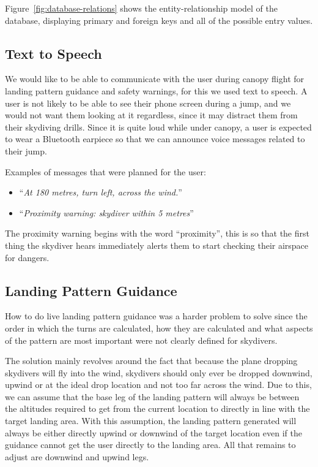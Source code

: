Figure~\ref{fig:database-relations} shows the entity-relationship model of the database, displaying primary and foreign keys and all of the possible entry values.

\subsection{Text to Speech}
We would like to be able to communicate with the user during canopy flight for landing pattern guidance and safety warnings, for this we used text to speech. A user is not likely to be able to see their phone screen during a jump, and we would not want them looking at it regardless, since it may distract them from their skydiving drills. Since it is quite loud while under canopy, a user is expected to wear a Bluetooth earpiece so that we can announce voice messages related to their jump.

Examples of messages that were planned for the user:
\begin{itemize}
  \item ``\textit{At 180 metres, turn left, across the wind.}''
  \item ``\textit{Proximity warning: skydiver within 5 metres}''
\end{itemize}

The proximity warning begins with the word ``proximity'', this is so that the first thing the skydiver hears immediately alerts them to start checking their airspace for dangers.

\subsection{Landing Pattern Guidance}\label{subsec:landing-guidance}
How to do live landing pattern guidance was a harder problem to solve since the order in which the turns are calculated, how they are calculated and what aspects of the pattern are most important were not clearly defined for skydivers.

The solution mainly revolves around the fact that because the plane dropping skydivers will fly into the wind, skydivers should only ever be dropped downwind, upwind or at the ideal drop location and not too far across the wind. Due to this, we can assume that the base leg of the landing pattern will always be between the altitudes required to get from the current location to directly in line with the target landing area. With this assumption, the landing pattern generated will always be either directly upwind or downwind of the target location even if the guidance cannot get the user directly to the landing area. All that remains to adjust are downwind and upwind legs.

